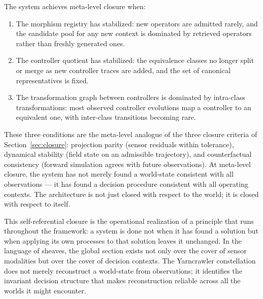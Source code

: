 \documentclass[12pt, oneside]{article}
\begin{document}
The system achieves meta-level closure when:
\begin{enumerate}
\item The morphism registry has stabilized: new operators are admitted rarely, and the
candidate pool for any new context is dominated by retrieved operators rather than
freshly generated ones.
\item The controller quotient has stabilized: the equivalence classes no longer split
or merge as new controller traces are added, and the set of canonical representatives
is fixed.
\item The transformation graph between controllers is dominated by intra-class
transformations: most observed controller evolutions map a controller to an equivalent
one, with inter-class transitions becoming rare.
\end{enumerate}
These three conditions are the meta-level analogue of the three closure criteria of
Section~\ref{sec:closure}: projection parity (sensor residuals within tolerance),
dynamical stability (field state on an admissible trajectory), and counterfactual
consistency (forward simulation agrees with future observations). At meta-level closure,
the system has not merely found a world-state consistent with all observations --- it has
found a decision procedure consistent with all operating contexts. The architecture is
not just closed with respect to the world; it is closed with respect to itself.

This self-referential closure is the operational realization of a principle that runs
throughout the framework: a system is done not when it has found a solution but when
applying its own processes to that solution leaves it unchanged. In the language of
sheaves, the global section exists not only over the cover of sensor modalities but over
the cover of decision contexts. The Yarncrawler constellation does not merely reconstruct
a world-state from observations; it identifies the invariant decision structure that
makes reconstruction reliable across all the worlds it might encounter.
\end{document}
